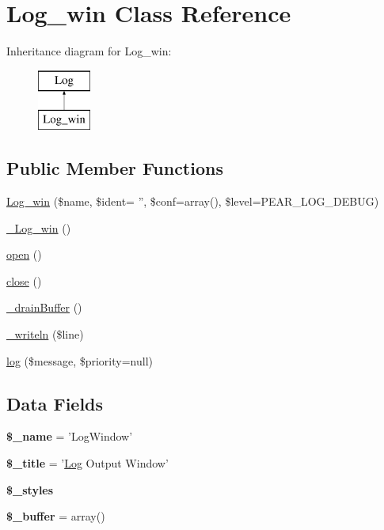 \hypertarget{class_log__win}{
\section{Log\_\-win Class Reference}
\label{class_log__win}
}
Inheritance diagram for Log\_\-win:\begin{figure}[H]
\begin{center}
\leavevmode
\includegraphics[height=2.000000cm]{class_log__win}
\end{center}
\end{figure}
\subsection*{Public Member Functions}
\begin{DoxyCompactItemize}
\item 
\hyperlink{class_log__win_ae8310b2b2145215f0ed8a284c13f28d6}{Log\_\-win} (\$name, \$ident= '', \$conf=array(), \$level=PEAR\_\-LOG\_\-DEBUG)
\item 
\hyperlink{class_log__win_a105957a27742b7953c02aaf45cf83da3}{\_\-Log\_\-win} ()
\item 
\hyperlink{class_log__win_a44a2ac59a3b91f8c18905dce700934d6}{open} ()
\item 
\hyperlink{class_log__win_aa69c8bf1f1dcf4e72552efff1fe3e87e}{close} ()
\item 
\hyperlink{class_log__win_aa8342f8432f21d61b3676e259dbf5fe5}{\_\-drainBuffer} ()
\item 
\hyperlink{class_log__win_aa9df86a96dcf84a7ac90f036ddb8c15a}{\_\-writeln} (\$line)
\item 
\hyperlink{class_log__win_ac3758dfa38a67df158a446847cf06413}{log} (\$message, \$priority=null)
\end{DoxyCompactItemize}
\subsection*{Data Fields}
\begin{DoxyCompactItemize}
\item 
\hypertarget{class_log__win_a1c89defaf5aa7ac8e526065e8572f580}{
{\bfseries \$\_\-name} = 'LogWindow'}
\label{class_log__win_a1c89defaf5aa7ac8e526065e8572f580}

\item 
\hypertarget{class_log__win_a49d523a090a700a0689f154d79932063}{
{\bfseries \$\_\-title} = '\hyperlink{class_log}{Log} Output Window'}
\label{class_log__win_a49d523a090a700a0689f154d79932063}

\item 
{\bfseries \$\_\-styles}
\item 
\hypertarget{class_log__win_a79d65a505a68daa9b33764798f34b0c7}{
{\bfseries \$\_\-buffer} = array()}
\label{class_log__win_a79d65a505a68daa9b33764798f34b0c7}

\end{DoxyCompactItemize}



